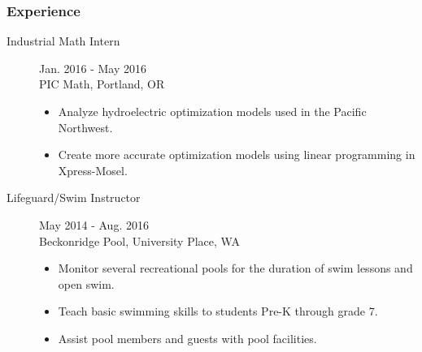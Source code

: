\documentclass{article}
\begin{document}
\subsubsection*{Experience}

    \begin{description}
        \item[Industrial Math Intern] \hfill Jan. 2016 - May 2016\\PIC Math, Portland, OR
        \begin{itemize}
            \item Analyze hydroelectric optimization models used in the Pacific Northwest.
            \item Create more accurate optimization models using linear programming in Xpress-Mosel.
        \end{itemize}
        
        \vspace{0.5em}

        \item [Lifeguard/Swim Instructor] \hfill May 2014 - Aug. 2016\\Beckonridge Pool, University Place, WA
        \begin{itemize}
            \item Monitor several recreational pools for the duration of swim lessons and open swim.
            \item Teach basic swimming skills to students Pre-K through grade 7.
            \item Assist pool members and guests with pool facilities.
        \end{itemize}

        
    \end{description}
\end{document}
